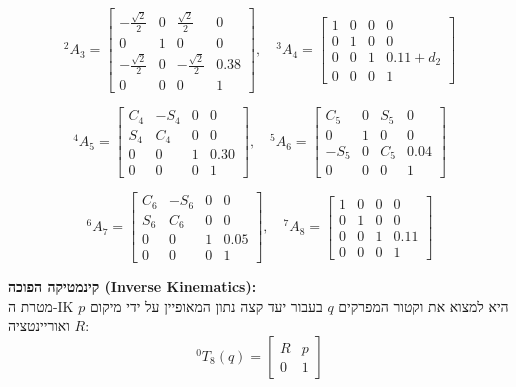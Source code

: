 \documentclass[11pt,a4paper]{article}
\begin{document}
\begin{equation*}
^2A_3 = \begin{bmatrix} -\frac{\sqrt{2}}{2} & 0 & \frac{\sqrt{2}}{2} & 0 \\ 0 & 1 & 0 & 0 \\ -\frac{\sqrt{2}}{2} & 0 & -\frac{\sqrt{2}}{2} & 0.38 \\ 0 & 0 & 0 & 1 \end{bmatrix}, \quad
^3A_4 = \begin{bmatrix} 1 & 0 & 0 & 0 \\ 0 & 1 & 0 & 0 \\ 0 & 0 & 1 & 0.11 + d_2 \\ 0 & 0 & 0 & 1 \end{bmatrix}
\end{equation*}

\begin{equation*}
^4A_5 = \begin{bmatrix} C_4 & -S_4 & 0 & 0 \\ S_4 & C_4 & 0 & 0 \\ 0 & 0 & 1 & 0.30 \\ 0 & 0 & 0 & 1 \end{bmatrix}, \quad
^5A_6 = \begin{bmatrix} C_5 & 0 & S_5 & 0 \\ 0 & 1 & 0 & 0 \\ -S_5 & 0 & C_5 & 0.04 \\ 0 & 0 & 0 & 1 \end{bmatrix}
\end{equation*}

\begin{equation*}
^6A_7 = \begin{bmatrix} C_6 & -S_6 & 0 & 0 \\ S_6 & C_6 & 0 & 0 \\ 0 & 0 & 1 & 0.05 \\ 0 & 0 & 0 & 1 \end{bmatrix}, \quad
^7A_8 = \begin{bmatrix} 1 & 0 & 0 & 0 \\ 0 & 1 & 0 & 0 \\ 0 & 0 & 1 & 0.11 \\ 0 & 0 & 0 & 1 \end{bmatrix}
\end{equation*}

\textbf{קינמטיקה הפוכה (\textenglish{Inverse Kinematics}):} \\
מטרת ה-IK היא למצוא את וקטור המפרקים $q$ בעבור יעד קצה נתון המאופיין על ידי מיקום $p$ ואוריינטציה $R$:
\begin{equation}
^0T_8(q) = \begin{bmatrix} R & p \\ 0 & 1 \end{bmatrix}
\end{equation}
\end{document}
